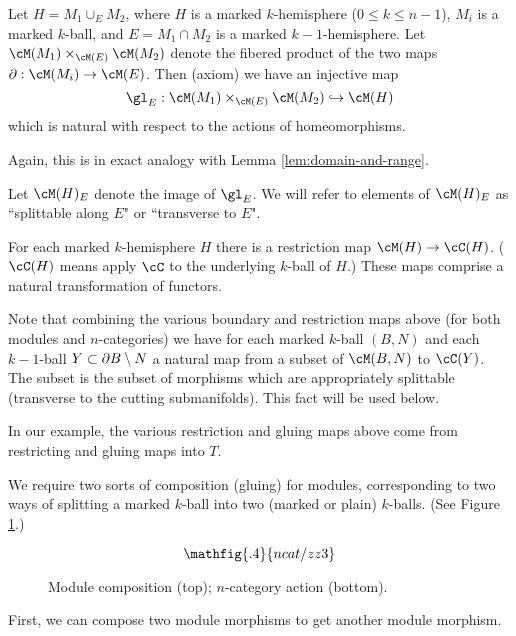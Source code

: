 \begin{lem}
{Let $H = M_1 \cup_E M_2$, where $H$ is a marked $k$-hemisphere ($0\le k\le n-1$),
$M_i$ is a marked $k$-ball, and $E = M_1\cap M_2$ is a marked $k{-}1$-hemisphere.
Let $\cM(M_1) \times_{\cM(E)} \cM(M_2)$ denote the fibered product of the 
two maps $\bd: \cM(M_i)\to \cM(E)$.
Then (axiom) we have an injective map
\[
	\gl_E : \cM(M_1) \times_{\cM(E)} \cM(M_2) \hookrightarrow \cM(H)
\]
which is natural with respect to the actions of homeomorphisms.}
\end{lem}
Again, this is in exact analogy with Lemma \ref{lem:domain-and-range}.

Let $\cM(H)_E$ denote the image of $\gl_E$.
We will refer to elements of $\cM(H)_E$ as ``splittable along $E$" or ``transverse to $E$". 


\begin{module-axiom}
{For each marked $k$-hemisphere $H$ there is a restriction map
$\cM(H)\to \cC(H)$.  
($\cC(H)$ means apply $\cC$ to the underlying $k$-ball of $H$.)
These maps comprise a natural transformation of functors.}
\end{module-axiom}

Note that combining the various boundary and restriction maps above
(for both modules and $n$-categories)
we have for each marked $k$-ball $(B, N)$ and each $k{-}1$-ball $Y\subset \partial B \setminus N$
a natural map from a subset of $\cM(B, N)$ to $\cC(Y)$.
The subset is the subset of morphisms which are appropriately splittable (transverse to the
cutting submanifolds).
This fact will be used below.

In our example, the various restriction and gluing maps above come from
restricting and gluing maps into $T$.

We require two sorts of composition (gluing) for modules, corresponding to two ways
of splitting a marked $k$-ball into two (marked or plain) $k$-balls.
(See Figure \ref{zzz3}.)

\begin{figure}[!ht]
\begin{equation*}
\mathfig{.4}{ncat/zz3}
\end{equation*}
\caption{Module composition (top); $n$-category action (bottom).}
\label{zzz3}
\end{figure}

First, we can compose two module morphisms to get another module morphism.

